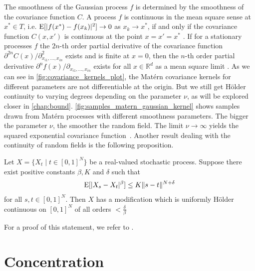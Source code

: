 The smoothness of the Gaussian process $f$ is determined by the smoothness of the covariance function $C$.
A process $f$ is continuous in the mean square sense at $x^{*} \in T$, i.e. $\operatorname*{E}[\lvert f(x^{*}) -f(x_{k}) \rvert^2] \to 0$ as $x_{k} \to x^{*}$, if and only if the covariance function $C(x,x')$ is continuous at the point $x=x'=x^{*}$ \cite{williams2006gaussian}.
If for a stationary processes $f$ the $2n$-th order partial derivative of the covariance function \( \partial^{2n}C(x)/\partial^{2}_{x_{i1}, \dots, x_{in}} \) exists and is finite at $x=0$, then the $n$-th order partial derivative \( \partial^{n} f(x)/ \partial_{x_{i1}, \dots, x_{in}} \) exists for all $x \in \mathbb{R}^{d}$ as a mean square limit \cite{williams2006gaussian}.
As we can see in \cref{fig:covariance_kernels_plot}, the Matérn covariance kernels for different parameters are not differentiable at the origin. But we still get Hölder continuity to varying degrees depending on the parameter $\nu$, as will be explored closer in \cref{chap:bound}.
\cref{fig:samples_matern_gaussian_kernel} shows samples drawn from Matérn processes with different smoothness parameters.
The bigger the parameter $\nu$, the smoother the random field. 
The limit $\nu \to \infty$ yields the squared exponential covariance function~\cite{porcu2023mat}.
Another result dealing with the continuity of random fields is the following proposition.
\begin{proposition}
    Let \( X = \{  X_{t} \mid t \in [0,1]^{N} \} \) be a real-valued stochastic process. Suppose there exist positive constants $\beta,K$ and $\delta$ such that
    \[
        \operatorname*{E}[\lvert X_{s} - X_{t} \rvert^{\beta}] \leq K \lVert s-t \rVert^{N+\delta}
    \]
    for all $s,t \in [0,1]^{N}$.
    Then $X$ has a modification which is uniformly Hölder continuous on $[0,1]^{N}$ of all orders $< \frac{\delta}{\beta}$ 
\end{proposition}
For a proof of this statement, we refer to \cite{xiao2010uniform}.    





\section{Concentration}






